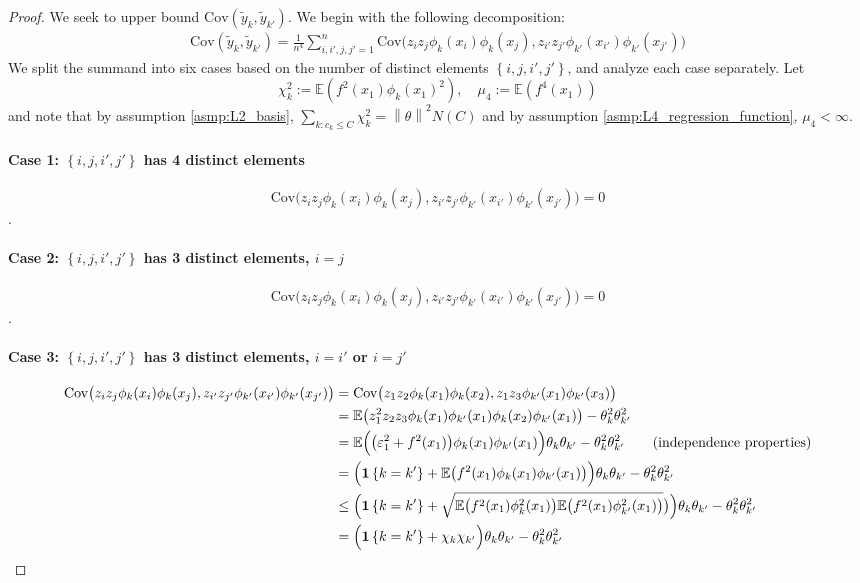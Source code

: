 \documentclass{article}
\newcommand{\norm}[1]{\left\lVert#1\right\rVert}
\newcommand{\set}[1]{\left\{#1\right\}}
\newcommand{\Cov}{\mathrm{Cov}}
\newcommand{\1}{\mathbb{I}}
\newcommand{\Ebb}{\mathbb{E}}
\theoremstyle{alden}
\theoremstyle{aldenthm}
\theoremstyle{definition}
\theoremstyle{remark}
\begin{document}
\begin{proof}
	We seek to upper bound $\Cov(\widetilde{y}_k, \widetilde{y}_{k'})$. We begin with the following decomposition:
	\begin{align*}
	\Cov(\widetilde{y}_k, \widetilde{y}_{k'}) = \frac{1}{n^4} \sum_{i,i',j,j' = 1}^{n} \Cov\bigl(z_iz_j\phi_k(x_i)\phi_k(x_j), z_{i'}z_{j'}\phi_{k'}(x_{i'})\phi_{k'}(x_{j'})\bigr)
	\end{align*}
	We split the summand into six cases based on the number of distinct elements $\set{i,j,i',j'}$, and analyze each case separately. Let
	\begin{equation*}
	\chi_k^2 := \Ebb(f^2(x_1)\phi_k(x_1)^2), \quad \mu_4 := \Ebb(f^4(x_1))
	\end{equation*}
	and note that by assumption \ref{asmp:L2_basis}, $\sum_{k: c_k \leq C}\chi_k^2 = \norm{\theta}^2 N(C)$ and by assumption \ref{asmp:L4_regression_function}, $\mu_4 < \infty$.
	
	\paragraph{Case 1: $\set{i,j,i',j'}$ has 4 distinct elements}
	$$\Cov\bigl(z_iz_j\phi_k(x_i)\phi_k(x_j), z_{i'}z_{j'}\phi_{k'}(x_{i'})\phi_{k'}(x_{j'})\bigr) = 0$$.
	
	\paragraph{Case 2: $\set{i,j,i',j'}$ has 3 distinct elements, $i = j$}
	$$\Cov\bigl(z_iz_j\phi_k(x_i)\phi_k(x_j), z_{i'}z_{j'}\phi_{k'}(x_{i'})\phi_{k'}(x_{j'})\bigr) = 0$$.
	
	\paragraph{Case 3: $\set{i,j,i',j'}$ has 3 distinct elements, $i = i'$ or $i = j'$}
	\begin{align*}
	\Cov\bigl(z_iz_j\phi_k(x_i)\phi_k(x_j), z_{i'}z_{j'}\phi_{k'}(x_{i'})\phi_{k'}(x_{j'})\bigr) & = \Cov\bigl( z_1z_2 \phi_k(x_1)\phi_k(x_2) , z_1z_3 \phi_{k'}(x_1)\phi_{k'}(x_3) \bigr) \\
	& = \Ebb\bigl(z_1^2z_2z_3 \phi_k(x_1) \phi_{k'}(x_1) \phi_k(x_2) \phi_{k'}(x_1) \bigr) - \theta_k^2 \theta_{k'}^2 \\
	& = \Ebb \Bigl( \bigl(\varepsilon_1^2 + f^2(x_1) \bigr) \phi_k(x_1) \phi_{k'}(x_1) \Bigr) \theta_k \theta_{k'}  - \theta_k^2 \theta_{k'}^2 \tag{independence properties} \\
	& = \Bigl(\mathbf{1}\set{k = k'} + \Ebb\bigl(  f^2(x_1) \phi_k(x_1) \phi_{k'}(x_1) \bigr) \Bigr) \theta_k \theta_{k'} -  \theta_k^2 \theta_{k'}^2 \\
	& \leq \Bigl(\mathbf{1}\set{k = k'} + \sqrt{\Ebb\bigl(  f^2(x_1) \phi_k^2(x_1)\bigr) \Ebb\bigl(  f^2(x_1) \phi_{k'}^2(x_1)\bigr)}  \bigr) \Bigr) \theta_k \theta_{k'}  - \theta_k^2 \theta_{k'}^2 \\
	& = \Bigl(\mathbf{1}\set{k = k'} + \chi_k \chi_{k'} \Bigr) \theta_k \theta_{k'}  - \theta_k^2 \theta_{k'}^2
	\end{align*}
	

\end{proof}
\end{document}
